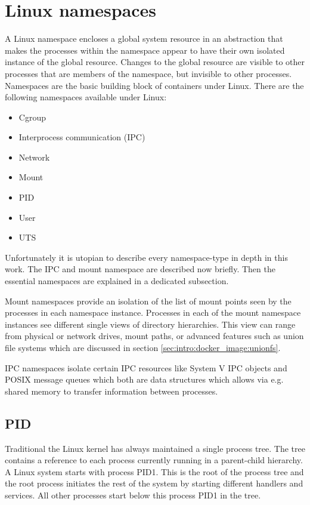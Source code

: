 \section{Linux namespaces}
\label{sec:intro:containerization:linux_namespaces}
A Linux namespace encloses a global system resource in an abstraction that makes the processes within the namespace appear to have their own isolated instance of the global resource. Changes to the global resource are visible to other processes that are members of the namespace, but invisible to other processes. Namespaces are the basic building block of containers under Linux. There are the following namespaces available under Linux:
\begin{itemize}
\item Cgroup
\item Interprocess communication (IPC)
\item Network
\item Mount
\item PID
\item User
\item UTS
\end{itemize}
Unfortunately it is utopian to describe every namespace-type in depth in this work. 
The IPC and mount namespace are described now briefly. Then the essential namespaces are explained in a dedicated subsection.

Mount namespaces provide an isolation of the list of mount points seen by the processes in each namespace instance. Processes in each of the mount namespace instances see different single views of directory hierarchies. This view can range from physical or network drives, mount paths, or advanced features such as union file systems which are discussed in section \ref{sec:intro:docker_image:unionfs}.


IPC namespaces isolate certain IPC resources like System V IPC objects and POSIX message queues which both are data structures which allows via e.g. shared memory to transfer information between processes.

\subsection{PID}
\label{sec:intro:containerization:linux_namespaces:pid_namespaces}
Traditional the Linux kernel has always maintained a single process tree. The tree contains a reference to each process currently running in a parent-child hierarchy. 
A Linux system starts with process PID1. This is the root of the process tree and the root process initiates the rest of the system by starting different handlers and services. All other processes start below this process PID1 in the tree. 


